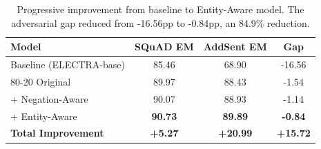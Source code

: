 
\begin{table}[h]
\centering
\small
\begin{tabular}{lccc}
\toprule
\textbf{Model} & \textbf{SQuAD EM} & \textbf{AddSent EM} & \textbf{Gap} \\
\midrule
Baseline (ELECTRA-base) & 85.46 & 68.90 & -16.56 \\
80-20 Original & 89.97 & 88.43 & -1.54 \\
+ Negation-Aware & 90.07 & 88.93 & -1.14 \\
+ Entity-Aware & \textbf{90.73} & \textbf{89.89} & \textbf{-0.84} \\
\midrule
\textbf{Total Improvement} & \textbf{+5.27} & \textbf{+20.99} & \textbf{+15.72} \\
\bottomrule
\end{tabular}
\caption{Progressive improvement from baseline to Entity-Aware model. The adversarial gap reduced from -16.56pp to -0.84pp, an 84.9\% reduction.}
\label{tab:mitigation_results}
\end{table}
